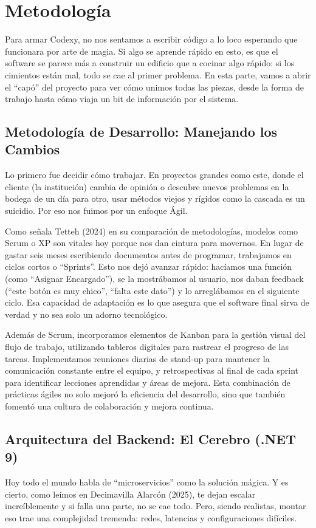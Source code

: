 \section{Metodología}
Para armar Codexy, no nos sentamos a escribir código a lo loco esperando que funcionara por arte de magia. Si algo se aprende rápido en esto, es que el software se parece más a construir un edificio que a cocinar algo rápido: si los cimientos están mal, todo se cae al primer problema. En esta parte, vamos a abrir el ``capó'' del proyecto para ver cómo unimos todas las piezas, desde la forma de trabajo hasta cómo viaja un bit de información por el sistema.

\subsection{Metodología de Desarrollo: Manejando los Cambios}
Lo primero fue decidir cómo trabajar. En proyectos grandes como este, donde el cliente (la institución) cambia de opinión o descubre nuevos problemas en la bodega de un día para otro, usar métodos viejos y rígidos como la cascada es un suicidio. Por eso nos fuimos por un enfoque Ágil.

Como señala Tetteh (2024) en su comparación de metodologías, modelos como Scrum o XP son vitales hoy porque nos dan cintura para movernos. En lugar de gastar seis meses escribiendo documentos antes de programar, trabajamos en ciclos cortos o ``Sprints''. Esto nos dejó avanzar rápido: hacíamos una función (como ``Asignar Encargado''), se la mostrábamos al usuario, nos daban feedback (``este botón es muy chico'', ``falta este dato'') y lo arreglábamos en el siguiente ciclo. Esa capacidad de adaptación es lo que asegura que el software final sirva de verdad y no sea solo un adorno tecnológico.

Además de Scrum, incorporamos elementos de Kanban para la gestión visual del flujo de trabajo, utilizando tableros digitales para rastrear el progreso de las tareas. Implementamos reuniones diarias de stand-up para mantener la comunicación constante entre el equipo, y retrospectivas al final de cada sprint para identificar lecciones aprendidas y áreas de mejora. Esta combinación de prácticas ágiles no solo mejoró la eficiencia del desarrollo, sino que también fomentó una cultura de colaboración y mejora continua.

\subsection{Arquitectura del Backend: El Cerebro (.NET 9)}
Hoy todo el mundo habla de ``microservicios'' como la solución mágica. Y es cierto, como leímos en Decimavilla Alarcón (2025), te dejan escalar increíblemente y si falla una parte, no se cae todo. Pero, siendo realistas, montar eso trae una complejidad tremenda: redes, latencias y configuraciones difíciles.

